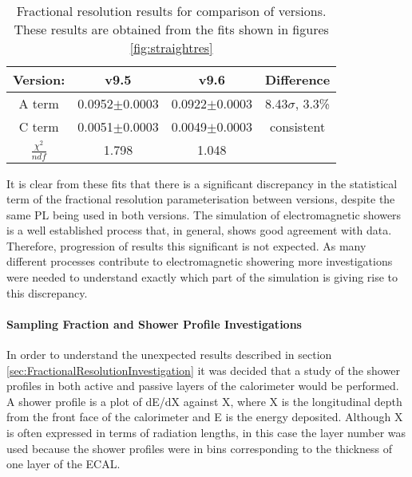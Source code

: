\begin{table}[h]
  \centering
  \begin{tabular}{|c|c|c|c|}
      \hline
      Version: & v9.5 & v9.6 & Difference  \\ \hline
      A term    & 0.0952$\pm$0.0003 & 0.0922$\pm$0.0003  & 8.43$\sigma$, 3.3\% \\ \hline
      C term    & 0.0051$\pm$0.0003 & 0.0049$\pm$0.0003 & consistent \\ \hline
      $\frac{\chi^2}{ndf}$   &1.798  & 1.048 &  \\ \hline
  \end{tabular}
  \caption{Fractional resolution results for comparison of \geant versions.  These results are obtained from the fits shown in figures \ref{fig:straightres}}
  \label{tab:results}
\end{table}

It is clear from these fits that there is a significant discrepancy in the statistical term of the fractional resolution parameterisation between \geant versions, despite the same PL being used in both versions.  The simulation of electromagnetic showers is a well established process that, in general, shows good agreement with data.  Therefore, progression of results this significant is not expected.  As many different processes contribute to electromagnetic showering more investigations were needed to understand exactly which part of the simulation is giving rise to this discrepancy.

\paragraph{Sampling Fraction and Shower Profile Investigations}
\label{sec:Sampling Fraction and Shower Profile Investigations}
In order to understand the unexpected results described in section \ref{sec:FractionalResolutionInvestigation} it was decided that a study of the shower profiles in both active and passive layers of the calorimeter would be performed.  A shower profile is a plot of dE/dX against X, where X is the longitudinal depth from the front face of the calorimeter and E is the energy deposited.  Although X is often expressed in terms of radiation lengths, in this case the layer number was used because the shower profiles were in bins corresponding to the thickness of one layer of the ECAL.


